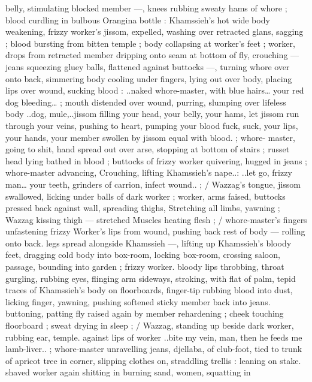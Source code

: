 belly, stimulating blocked member ---, knees rubbing sweaty hams of 
whore ; blood curdling in bulbous Orangina bottle : Khamssieh's hot 
wide body weakening, frizzy worker's jissom, expelled, washing over 
retracted glans, sagging ; blood bursting from bitten temple ; body 
collapsing at worker's feet ; worker, drops from retracted member 
dripping onto seam at bottom of fly, crouching --- jeans squeezing 
gluey balls, flattened against buttocks ---, turning whore over onto 
back, simmering body cooling under fingers, lying out over body, 
placing lips over wound, sucking blood : {\gl}..naked whore-master, with 
blue hairs{\ldots} your red dog bleeding{\ldots}{\gr} ; mouth distended over wound, 
purring, slumping over lifeless body{\td} {\gl}..dog, mule,..jissom filling 
your head, your belly, your hams, let jissom run through your veins, 
pushing to heart, pumping your blood{\td} fuck, suck, your lips, your 
hands, your member swollen by jissom equal with blood.{\gr} ; whore- 
master, going to shit, hand spread out over arse, stopping at bottom 
of stairs ; russet head lying bathed in blood ; buttocks of frizzy 
worker quivering, hugged in jeans ; whore-master advancing, 
Crouching, lifting Khamssieh's nape..: {\gl}..let go, frizzy man{\ldots} your 
teeth, grinders of carrion, infect wound..{\gr} ; {\slash} Wazzag's tongue, 
jissom swallowed, licking under balls of dark worker ; worker, arms 
faised, buttocks pressed back against wall, spreading thighs, 
Stretching all limbs, yawning ; Wazzag kissing thigh --- stretched 
Muscles heating flesh ; {\slash} whore-master's fingers unfastening frizzy 
Worker's lips from wound, pushing back rest of body --- rolling onto 
back. legs spread alongside Khamssieh ---, lifting up Khamssieh's 
bloody feet, dragging cold body into box-room, locking box-room, 
crossing saloon, passage, bounding into garden ; frizzy worker. 
bloody lips throbbing, throat gurgling, rubbing eyes, flinging arm 
sideways, stroking, with flat of palm, tepid traces of Khamssieh's 
body on floorboards, finger-tip rubbing blood into dust, licking 
finger, yawning, pushing softened sticky member back into jeans. 
buttoning, patting fly raised again by member rehardening ; cheek 
touching floorboard ; sweat drying in sleep ; {\slash} Wazzag, standing up 
beside dark worker, rubbing ear, temple. against lips of worker 
{\gl}..bite my vein, man, then he feeds me lamb-liver..{\gr} ; whore-master 
unravelling jeans, djellaba, of club-foot, tied to trunk of apricot tree 
in corner, slipping clothes on, straddling trellis : leaning on stake. 
shaved worker again shitting in burning sand, women, squatting in 
